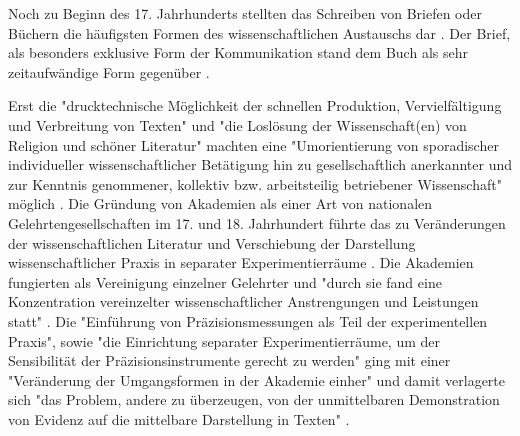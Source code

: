 Noch zu Beginn des 17. Jahrhunderts stellten das Schreiben von Briefen oder Büchern die häufigsten Formen des wissenschaftlichen Austauschs dar \cite{porter_1964_scientific}. Der Brief, als besonders exklusive Form der Kommunikation stand dem Buch als sehr zeitaufwändige Form gegenüber \cite{fecher_hiig_2014}.

Erst die "drucktechnische Möglichkeit der schnellen Produktion, Vervielfältigung und Verbreitung von Texten" und "die Loslösung der Wissenschaft(en) von Religion und schöner Literatur" machten eine "Umorientierung von sporadischer individueller wissenschaftlicher Betätigung hin zu gesellschaftlich anerkannter und zur Kenntnis genommener, kollektiv bzw. arbeitsteilig betriebener Wissenschaft" möglich \cite{graefen2007_wissenschaftliche_artikel}. Die Gründung von Akademien als einer Art von nationalen Gelehrtengesellschaften im 17. und 18. Jahrhundert führte das zu Veränderungen der wissenschaftlichen Literatur \cite{graefen2007_wissenschaftliche_artikel} und Verschiebung der Darstellung wissenschaftlicher Praxis in separater Experimentierräume \cite{weingart_2005_wissenschaft}. Die Akademien fungierten als Vereinigung einzelner Gelehrter und "durch sie fand eine Konzentration vereinzelter wissenschaftlicher Anstrengungen und Leistungen statt" \cite{graefen2007_wissenschaftliche_artikel}. Die "Einführung von Präzisionsmessungen als Teil der experimentellen Praxis", sowie "die Einrichtung separater Experimentierräume, um der Sensibilität der Präzisionsinstrumente gerecht zu werden" ging mit einer "Veränderung der Umgangsformen in der Akademie einher" und damit verlagerte sich "das Problem, andere zu überzeugen, von der unmittelbaren Demonstration von Evidenz auf die mittelbare Darstellung in Texten" \cite{weingart_2005_wissenschaft}.

